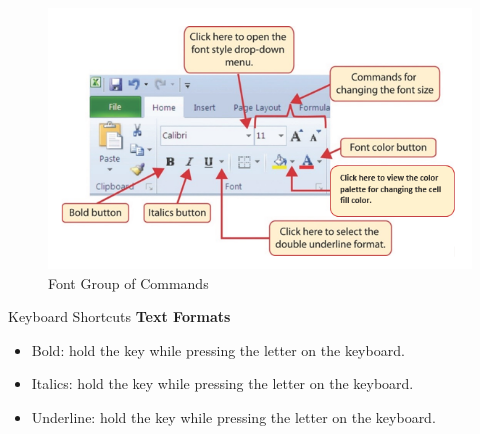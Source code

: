 \begin{figure}[H]
	\centering
	\includegraphics[width=\maxwidth{.95\linewidth}]{gfx/ch01_fig34}
	\caption{Font Group of Commands}
	\label{01:fig34}
\end{figure}

\begin{center}
	\begin{shtcutbox}{Keyboard Shortcuts}
		\textbf{Text Formats}
		\\
		\begin{itemize}
			\setlength{\itemsep}{0pt}
			\setlength{\parskip}{0pt}
			\setlength{\parsep}{0pt}
			
			\item Bold: hold the  key while pressing the letter  on the keyboard.
			\item Italics: hold the  key while pressing the letter  on the keyboard.
			\item Underline: hold the  key while pressing the letter  on the keyboard.
			
		\end{itemize}
	\end{shtcutbox}
\end{center}

